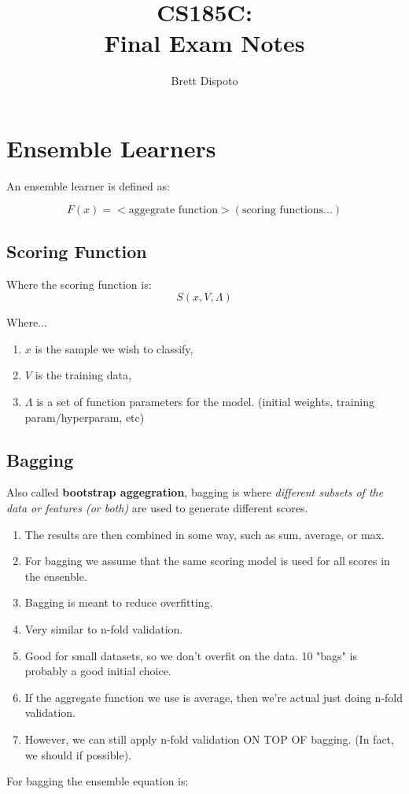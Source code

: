 \documentclass[12pt]{article}
\title{CS185C: \\ 
Final Exam Notes}
\author{Brett Dispoto}
\begin{document}
\maketitle

\section{Ensemble Learners}
An ensemble learner is defined as:

\begin{equation}
  F(x) = <\text{aggegrate function}>(\text{scoring functions...})
\end{equation}

\subsection{Scoring Function}
Where the scoring function is:
\begin{equation}
  S(x, V, \Lambda)
\end{equation}

Where...
\begin{enumerate}
  \item $x$ is the sample we wish to classify,
  \item $V$ is the training data,
  \item $\Lambda$ is a set of function parameters for the model. (initial weights, training param/hyperparam, etc)
\end{enumerate}


\subsection{Bagging}
Also called \textbf{bootstrap aggegration}, bagging is where \textit{different subsets of the data or features (or both)} are used to generate different scores.
\begin{enumerate}
  \item The results are then combined in some way, such as sum, average, or max.
  \item For bagging we assume that the same scoring model is used for all scores in the ensenble. 
  \item Bagging is meant to reduce overfitting.
  \item Very similar to n-fold validation.
  \item Good for small datasets, so we don't overfit on the data. 10 "bags" is probably a good initial choice.
  \item If the aggregate function we use is average, then we're actual just doing n-fold validation. 
  \item However, we can still apply n-fold validation ON TOP OF bagging. (In fact, we should if possible).
\end{enumerate}
For bagging the ensemble equation is:
\end{document}
